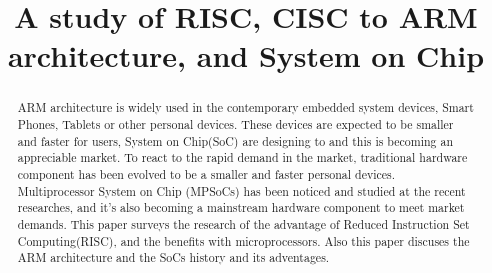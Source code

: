 \documentclass[conference]{IEEEtran}
\begin{document}
\title{A study of RISC, CISC to ARM architecture, and System on Chip }


\author{
}


% 









\maketitle

\begin{abstract}
ARM architecture is widely used in the contemporary embedded system devices, Smart Phones, Tablets or other personal devices. These devices  are expected to be smaller and faster for users, System on Chip(SoC) are designing to and this is becoming an appreciable market. To react to the rapid demand in the market, traditional hardware component has been evolved  to be a smaller and faster personal devices. Multiprocessor System on Chip (MPSoCs) has been noticed and studied at the recent researches, and it's also becoming a mainstream hardware component to meet market demands. This paper surveys the research of the advantage of Reduced Instruction Set Computing(RISC), and the benefits with microprocessors. Also this paper discuses the ARM architecture and the SoCs history and its adventages.
\end{abstract}
\end{document}
